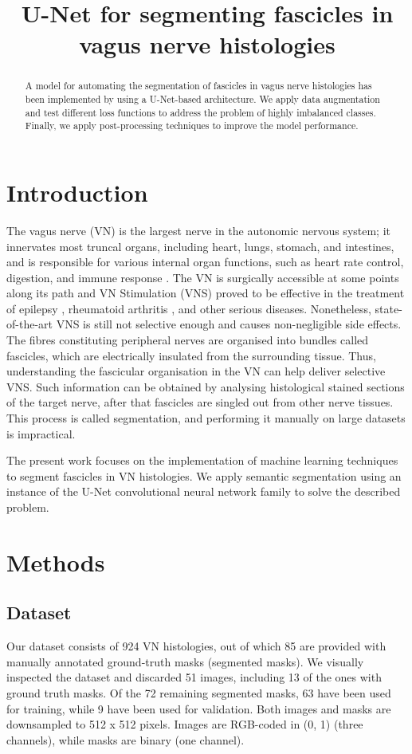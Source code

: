 \documentclass[conference]{IEEEtran}
\title{U-Net for segmenting fascicles in vagus nerve histologies}
\author{
\IEEEauthorblockN{Bioli Ivan}
\IEEEauthorblockA{\href{mailto:ivan.bioli@epfl.ch}{ivan.bioli@epfl.ch}}
\and
\IEEEauthorblockN{Cao Khanh Nguyen}
\IEEEauthorblockA{\href{mailto:cao.nguyen@epfl.ch}{cao.nguyen@epfl.ch}}
\and
\IEEEauthorblockN{Hasan Syed Umer}
\IEEEauthorblockA{\href{mailto:umer.hasan@epfl.ch}{umer.hasan@epfl.ch}}}
\begin{document}
\maketitle
    \begin{abstract}
   A model for automating the segmentation of fascicles in vagus nerve histologies has been implemented by using a U-Net-based architecture. We apply data augmentation and test different loss functions to address the problem of highly imbalanced classes. Finally, we apply post-processing techniques to improve the model performance.   
    \end{abstract}


\section{Introduction}
\label{sec:introduction}
The vagus nerve (VN) is the largest nerve in the autonomic nervous system; it innervates most truncal organs, including heart, lungs, stomach, and intestines, and is responsible for various internal organ functions, such as heart rate control, digestion, and immune response \cite{vagus}. The VN is surgically accessible at some points along its path and VN Stimulation (VNS) \cite{vns} proved to be effective in the treatment of epilepsy \cite{epilepsy}, rheumatoid arthritis \cite{arthritis}, and other serious diseases. Nonetheless, state-of-the-art VNS is still not selective enough and causes non-negligible side effects. The fibres constituting peripheral nerves are organised into bundles called fascicles, which are electrically insulated from the surrounding tissue. Thus, understanding the fascicular organisation in the VN can help deliver selective VNS. Such information can be obtained by analysing histological stained sections of the target nerve, after that fascicles are singled out from other nerve tissues. This process is called segmentation, and performing it manually on large datasets is impractical. 

The present work focuses on the implementation of machine learning techniques to segment fascicles in VN histologies. We apply semantic segmentation using an instance of the U-Net convolutional neural network family \cite{unet} to solve the described problem. 


\section{Methods}
\subsection{Dataset}
Our dataset consists of 924 VN histologies, out of which 85 are provided with manually annotated ground-truth masks (segmented masks). We visually inspected the dataset and discarded 51 images, including 13 of the ones with ground truth masks. Of the 72 remaining segmented masks, 63 have been used for training, while 9 have been used for validation. Both images and masks are downsampled to 512 x 512 pixels. Images are RGB-coded in (0, 1) (three channels), while masks are binary (one channel).
\end{document}
